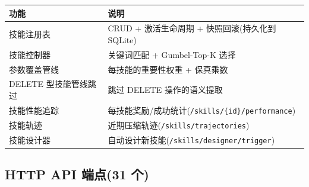 \documentclass[11pt,a4paper]{article}
\begin{document}
\begin{longtable}{@{}lp{10cm}@{}}
  \toprule
  功能 & 说明 \\
  \midrule
  技能注册表 & CRUD + 激活生命周期 + 快照回滚(持久化到 SQLite) \\
  技能控制器 & 关键词匹配 + Gumbel-Top-K 选择 \\
  参数覆盖管线 & 每技能的重要性权重 + 保真乘数 \\
  DELETE 型技能管线跳过 & 跳过 DELETE 操作的语义提取 \\
  技能性能追踪 & 每技能奖励/成功统计(\texttt{/skills/\{id\}/performance}) \\
  技能轨迹 & 近期压缩轨迹(\texttt{/skills/trajectories}) \\
  技能设计器 & 自动设计新技能(\texttt{/skills/designer/trigger}) \\
  \bottomrule
\end{longtable}

\subsection{HTTP API 端点(31 个)}
\end{document}
